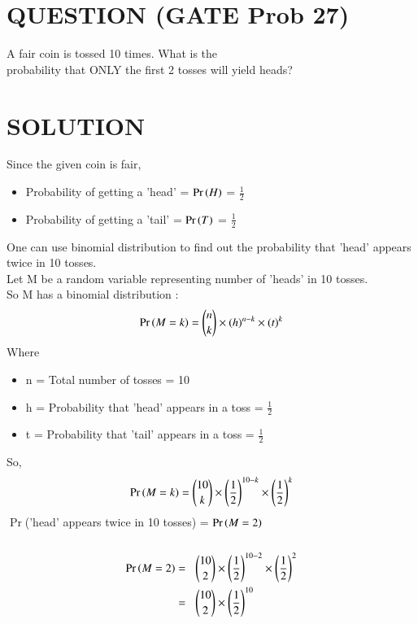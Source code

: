 \documentclass[journal,12pt,twocolumn]{IEEEtran}
\begin{document}
\section*{QUESTION (GATE Prob 27)}
A fair coin is tossed 10 times. What is the \\probability that ONLY the first 2 tosses will yield heads?
\section*{SOLUTION}
Since the given coin is fair,
\bigskip
\begin{itemize}
\item Probability of getting a 'head' = $\Pr\left(H\right)$ = \(\frac{1}{2}\)
\item Probability of getting a 'tail' = $\Pr\left(T\right)$ = \( \frac{1}{2} \)
\end{itemize}
\bigskip
One can use binomial distribution to find out the probability that 'head' appears twice in 10 tosses.\\
Let M be a random variable representing number of 'heads' in 10 tosses.\\
So M has a binomial distribution : 
\begin{align}
\Pr\left(M=k\right) = {{n}\choose{k}} \times (h)^{n-k} \times (t)^{k}\label{0.0.1}
\end{align}
Where
\begin{itemize}
    \item n = Total number of tosses = 10
    \item h = Probability that 'head' appears in a toss = \( \frac{1}{2} \)
    \item t = Probability that 'tail' appears in a toss = \( \frac{1}{2} \)
\end{itemize}
\bigskip
So,
\begin{align}
\Pr\left(M=k\right) = {{10}\choose{k}} \times \left(\frac{1}{2}\right)^{10-k} \times \left(\frac{1}{2}\right)^{k}\label{0.0.2}
\end{align}
\bigskip
$\Pr$('head' appears twice in 10 tosses) = $\Pr\left(M = 2\right)$\\\\
\begin{align}
\pr{M = 2} = & \hspace{0.3cm}{{10}\choose{2}} \times \brak{\frac{1}{2}}^{10-2} \times \brak{\frac{1}{2}}^{2}\\\notag
\bigskip
= & \hspace{0.3cm}{{10}\choose{2}} \times \brak{\frac{1}{2}}^{10}\\\notag
\end{align}
\end{document}

